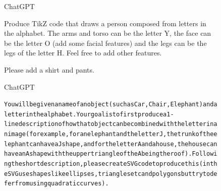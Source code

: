 \begin{figure}[H]
\begin{AIbox}{ChatGPT}
\parbox[t]{0.75\textwidth}{Produce TikZ code that draws a person composed from letters in the alphabet. The arms and torso can be the letter Y, the face can be the letter O (add some facial features)  and the legs can be the legs of the letter H. Feel free to add other features.}\hspace{50px}
\tcbline
\parbox[t]{0.75\textwidth}{Please add a shirt and pants.}\hspace{50px}

\end{AIbox}

\begin{AIbox}{ChatGPT}\scriptsize\vspace{-5px}
\parbox{1\textwidth}{\begin{alltt}
You will be given a name of an object (such as Car, Chair, Elephant) and a letter in the alphabet. Your goal is to first produce a 1-line description of how that object can be combined with the letter in an image (for example, for an elephant and the letter J, the trunk of the elephant can have a J shape, and for the letter A and a house, the house can have an A shape with the upper triangle of the A being the roof). Following the short description, please create SVG code to produce this (in the SVG use shapes like ellipses, triangles etc and polygons but try to defer from using quadratic curves).\\


\end{alltt}}
\end{AIbox}
\end{figure}
